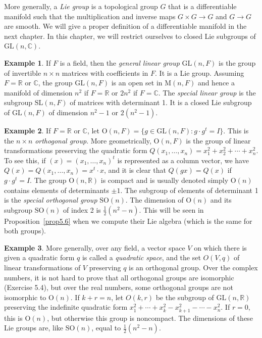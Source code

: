 \documentclass[12pt,reqno]{book}%
\theoremstyle{definition}
\newtheorem{example}{Example}[chapter]
\theoremstyle{remark}
\theoremstyle{theorem}
\theoremstyle{remark}
\begin{document}
More generally, a \emph{Lie group} is a topological group $G$ that is a differentiable manifold such that the multiplication and inverse maps $G \times G \to G$ and $G \to G$ are smooth.
We will give a proper definition of a differentiable manifold in the next chapter.
In this chapter, we will restrict ourselves to closed Lie subgroups of $\mathrm{GL}(n, \mathbb{C})$.

\begin{example}\label{}
    If $F$ is a field, then the \emph{general linear group} $\mathrm{GL}(n,F)$ is the group of invertible $n \times n$ matrices with coefficients in $F$.
    It is a Lie group.
    Assuming $F = \mathbb{R}$ or $\mathbb{C}$, the group $\mathrm{GL}(n,F)$ is an open set in $\mathrm{M}(n,F)$ and hence a manifold of dimension $n^2$ if $F = \mathbb{R}$ or $2n^2$ if $F = \mathbb{C}$.
    The \emph{special linear group} is the subgroup $\mathrm{SL}(n,F)$ of matrices with determinant 1.
    It is a closed Lie subgroup of $\mathrm{GL}(n,F)$ of dimension $n^2 - 1$ or $2(n^2 - 1)$.
\end{example}

\begin{example}\label{}
    If $F = \mathbb{R}$ or $\mathbb{C}$, let $\mathrm{O}(n,F) = \{g \in \mathrm{GL}(n,F) : g \cdot g^t = I\}$.
    This is the $n \times n$ \emph{orthogonal group}.
    More geometrically, $\mathrm{O}(n,F)$ is the group of linear transformations preserving the quadratic form $Q(x_1, \ldots, x_n) = x_{1}^{2} + x_{2}^{2} + \cdots + x_{n}^{2}$.
    To see this, if $(x) = (x_1, \ldots, x_n)^t$ is represented as a column vector, we have $Q(x) = Q(x_1, \ldots, x_n) = x^t \cdot x$, and it is clear that $Q(gx) = Q(x)$ if $g \cdot g^t = I$.
    The group $\mathrm{O}(n, \mathbb{R})$ is compact and is usually denoted simply $\mathrm{O}(n)$ contains elements of determinants $\pm1$.
    The subgroup of elements of determinant 1 is the \emph{special orthogonal group} $\mathrm{SO}(n)$.
    The dimension of $\mathrm{O}(n)$ and its subgroup $\mathrm{SO}(n)$ of index 2 is $\frac{1}{2}(n^2 - n)$.
    This will be seen in Proposition~\ref{prop5.6} when we compute their Lie algebra (which is the same for both groups).
\end{example}

\begin{example}\label{}
    More generally, over any field, a vector space $V$ on which there is given a quadratic form $q$ is called a \emph{quadratic space}, and the set $O(V, q)$ of linear transformations of $V$ preserving $q$ is an orthogonal group.
    Over the complex numbers, it is not hard to prove that all orthogonal groups are isomorphic (Exercise 5.4), but over the real numbers, some orthogonal groups are not isomorphic to $\mathrm{O}(n)$.
    If $k + r = n$, let $O(k, r)$ be the subgroup of $\mathrm{GL}(n, \mathbb{R})$ preserving the indefinite quadratic form $x_{1}^{2} + \cdots + x_{k}^{2} - x_{k+1}^{2} - \cdots - x_{n}^{2}$.
    If $r = 0$, this is $\mathrm{O}(n)$, but otherwise this group is noncompact.
    The dimensions of these Lie groups are, like $\mathrm{SO}(n)$, equal to $\frac{1}{2} (n^2 - n)$.
\end{example}
\end{document}
